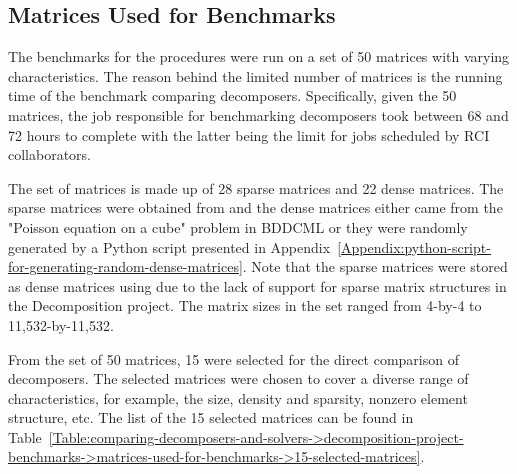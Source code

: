 \subsection{Matrices Used for Benchmarks}\label{Subsection:comparing-decomposers-and-solvers->decomposition-project-benchmarks->matrices-used-for-benchmarks}
The benchmarks for the procedures were run on a set of 50 matrices with varying characteristics.
The reason behind the limited number of matrices is the running time of the benchmark comparing decomposers.
Specifically, given the 50 matrices, the job responsible for benchmarking decomposers took between 68 and 72 hours to complete with the latter being the limit for jobs scheduled by RCI collaborators.

The set of matrices is made up of 28 sparse matrices and 22 dense matrices.
The sparse matrices were obtained from  \cite{Davis2011} and the dense matrices either came from the "Poisson equation on a cube" problem in BDDCML or they were randomly generated by a Python script presented in Appendix~\ref{Appendix:python-script-for-generating-random-dense-matrices}.
Note that the sparse matrices were stored as dense matrices using  due to the lack of support for sparse matrix structures in the Decomposition project.
The matrix sizes in the set ranged from 4-by-4 to 11,532-by-11,532.

From the set of 50 matrices, 15 were selected for the direct comparison of decomposers.
The selected matrices were chosen to cover a diverse range of characteristics, for example, the size, density and sparsity, nonzero element structure, etc.
The list of the 15 selected matrices can be found in Table~\ref{Table:comparing-decomposers-and-solvers->decomposition-project-benchmarks->matrices-used-for-benchmarks->15-selected-matrices}.

